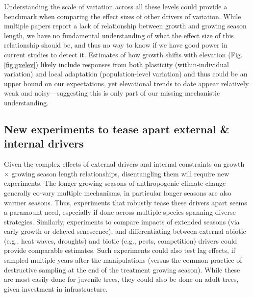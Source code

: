 \documentclass[11pt]{article}
\begin{document}
Understanding the scale of variation across all these levels could provide a benchmark when comparing the effect sizes of other drivers of variation. While multiple papers report a lack of relationship between growth and growing season length, we have no fundamental understanding of what the effect size of this relationship should be, and thus no way to know if we have good power in current studies to detect it. Estimates of how growth shifts with elevation (Fig. \ref{fig:gxelev}) likely include responses from both plasticity (within-individual variation) and local adaptation (population-level variation) and thus could be an upper bound on our expectations, yet elevational trends to date appear relatively weak and noisy---suggesting this is only part of our missing mechanistic understanding. 


\subsection*{New experiments to tease apart external \& internal drivers}

Given the complex effects of external drivers and internal constraints on growth $\times$ growing season length relationships, disentangling them will require new experiments. The longer growing seasons of anthropogenic climate change generally co-vary multiple mechanisms, in particular longer seasons are also warmer seasons. Thus, experiments that robustly tease these drivers apart seems a paramount need, especially if done across multiple species spanning diverse strategies. Similarly, experiments to compare impacts of extended seasons (via early growth or delayed senescence), and differentiating between external abiotic (e.g., heat waves, droughts) and biotic (e.g., pests, competition) drivers could provide comparable estimates. Such experiments could also test lag effects, if sampled multiple years after the manipulations (versus the common practice of destructive sampling at the end of the treatment growing season). While these are most easily done for juvenile trees, they could also be done on adult trees, given investment in infrastructure. %
\end{document}
